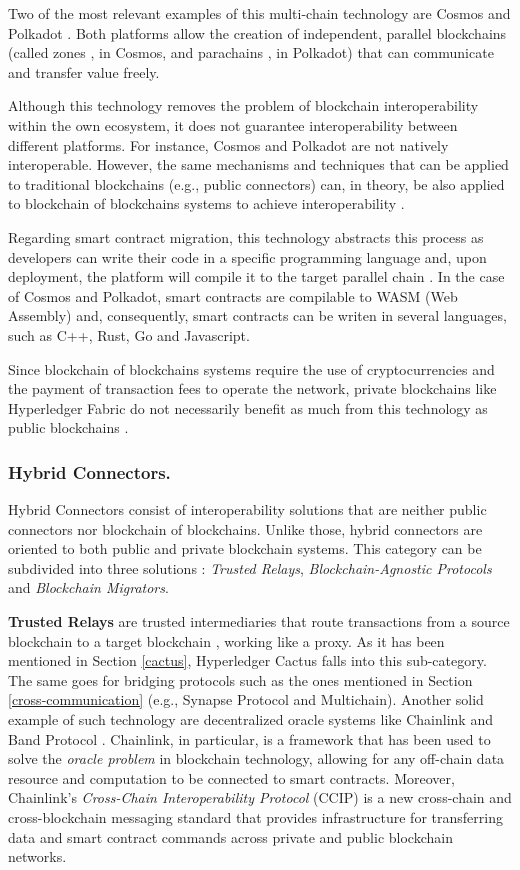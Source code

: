 \documentclass[runningheads]{llncs}
\begin{document}
Two of the most relevant examples of this multi-chain technology are Cosmos \cite{cosmos} and Polkadot \cite{wood}. Both platforms allow the creation of independent, parallel blockchains (called zones \cite{cosmos}, in Cosmos, and parachains \cite{wood}, in Polkadot) that can communicate and transfer value freely.

Although this technology removes the problem of blockchain interoperability within the own ecosystem, it does not guarantee interoperability between different platforms. For instance, Cosmos and Polkadot are not natively interoperable. However, the same mechanisms and techniques that can be applied to traditional blockchains (e.g., public connectors) can, in theory, be also applied to blockchain of blockchains systems to achieve interoperability \cite{survey}.

Regarding smart contract migration, this technology abstracts this process as developers can write their code in a specific programming language and, upon deployment, the platform will compile it to the target parallel chain \cite{wood}. In the case of Cosmos and Polkadot, smart contracts are compilable to WASM (Web Assembly) and, consequently, smart contracts can be writen in several languages, such as C++, Rust, Go and Javascript.

Since blockchain of blockchains systems require the use of cryptocurrencies and the payment of transaction fees to operate the network, private blockchains like Hyperledger Fabric do not necessarily benefit as much from this technology as public blockchains \cite{survey}.


\subsubsection{Hybrid Connectors.} \label{hybrid-connectors} Hybrid Connectors consist of interoperability solutions that are neither public connectors nor blockchain of blockchains. Unlike those, hybrid connectors are oriented to both public and private blockchain systems. This category can be subdivided into three solutions \cite{survey}: \textit{Trusted Relays}, \textit{Blockchain-Agnostic Protocols} and \textit{Blockchain Migrators}. 

\textbf{Trusted Relays} are trusted intermediaries that route transactions from a source blockchain to a target blockchain \cite{survey}, working like a proxy. As it has been mentioned in Section \ref{cactus}, Hyperledger Cactus falls into this sub-category. The same goes for bridging protocols such as the ones mentioned in Section \ref{cross-communication} (e.g., Synapse Protocol and Multichain). Another solid example of such technology are decentralized oracle systems like Chainlink \cite{chainlink} and Band Protocol \cite{band}. Chainlink, in particular, is a framework that has been used to solve the \textit{oracle problem} in blockchain technology, allowing for any off-chain data resource and computation to be connected to smart contracts. Moreover, Chainlink's \textit{Cross-Chain Interoperability Protocol} (CCIP) \cite{ccip} is a new cross-chain and cross-blockchain messaging standard that provides infrastructure for transferring data and smart contract commands across private and public blockchain networks.
\end{document}
